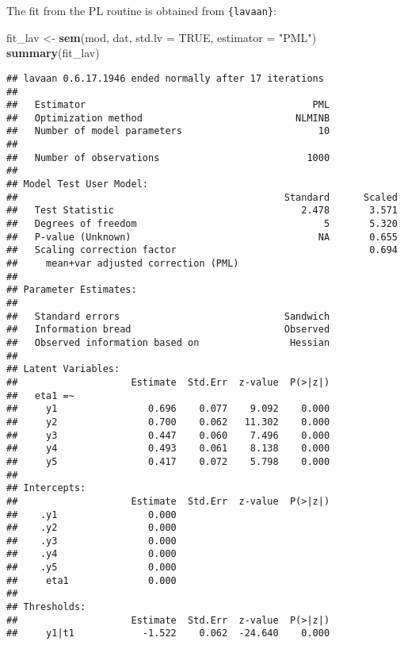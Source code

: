 \documentclass[
]{article}
\newenvironment{Shaded}{\begin{snugshade}}{\end{snugshade}}
\newcommand{\AttributeTok}[1]{\textcolor[rgb]{0.13,0.29,0.53}{#1}}
\newcommand{\ConstantTok}[1]{\textcolor[rgb]{0.56,0.35,0.01}{#1}}
\newcommand{\FunctionTok}[1]{\textcolor[rgb]{0.13,0.29,0.53}{\textbf{#1}}}
\newcommand{\NormalTok}[1]{#1}
\newcommand{\OtherTok}[1]{\textcolor[rgb]{0.56,0.35,0.01}{#1}}
\newcommand{\StringTok}[1]{\textcolor[rgb]{0.31,0.60,0.02}{#1}}
\begin{document}
The fit from the PL routine is obtained from \texttt{\{lavaan\}}:

\begin{Shaded}
\begin{Highlighting}[]
\NormalTok{fit\_lav }\OtherTok{\textless{}{-}} \FunctionTok{sem}\NormalTok{(mod, dat, }\AttributeTok{std.lv =} \ConstantTok{TRUE}\NormalTok{, }\AttributeTok{estimator =} \StringTok{"PML"}\NormalTok{)}
\FunctionTok{summary}\NormalTok{(fit\_lav)}
\end{Highlighting}
\end{Shaded}

\begin{verbatim}
## lavaan 0.6.17.1946 ended normally after 17 iterations
## 
##   Estimator                                        PML
##   Optimization method                           NLMINB
##   Number of model parameters                        10
## 
##   Number of observations                          1000
## 
## Model Test User Model:
##                                               Standard      Scaled
##   Test Statistic                                 2.478       3.571
##   Degrees of freedom                                 5       5.320
##   P-value (Unknown)                                 NA       0.655
##   Scaling correction factor                                  0.694
##     mean+var adjusted correction (PML)                            
## 
## Parameter Estimates:
## 
##   Standard errors                             Sandwich
##   Information bread                           Observed
##   Observed information based on                Hessian
## 
## Latent Variables:
##                    Estimate  Std.Err  z-value  P(>|z|)
##   eta1 =~                                             
##     y1                0.696    0.077    9.092    0.000
##     y2                0.700    0.062   11.302    0.000
##     y3                0.447    0.060    7.496    0.000
##     y4                0.493    0.061    8.138    0.000
##     y5                0.417    0.072    5.798    0.000
## 
## Intercepts:
##                    Estimate  Std.Err  z-value  P(>|z|)
##    .y1                0.000                           
##    .y2                0.000                           
##    .y3                0.000                           
##    .y4                0.000                           
##    .y5                0.000                           
##     eta1              0.000                           
## 
## Thresholds:
##                    Estimate  Std.Err  z-value  P(>|z|)
##     y1|t1            -1.522    0.062  -24.640    0.000

\end{verbatim}
\end{document}
